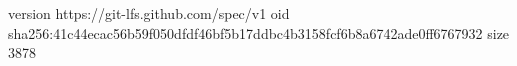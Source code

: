 version https://git-lfs.github.com/spec/v1
oid sha256:41c44ecac56b59f050dfdf46bf5b17ddbc4b3158fcf6b8a6742ade0ff6767932
size 3878
